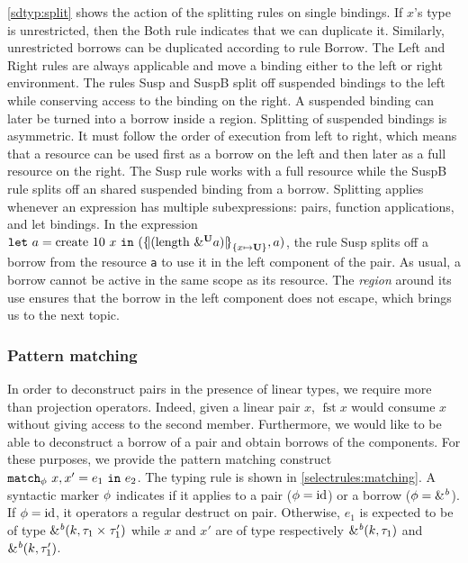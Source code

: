 \cref{sdtyp:split} shows the action of the splitting rules on single
bindings. If $x$'s type is unrestricted, then
the {\sc Both} rule indicates that we can duplicate it.
Similarly, unrestricted borrows can be duplicated according to rule
{\sc Borrow}.
The {\sc Left} and {\sc Right} rules are always applicable and move a binding
either to the left or right environment.
The rules {\sc Susp} and {\sc SuspB} split off suspended bindings to
the left while conserving access to the binding on the right.
A suspended binding can later be turned
into a borrow inside a region. Splitting of suspended bindings is
asymmetric. It must follow the order of execution from left to right,
which means that a resource can be used first as a borrow on the left
and then later as a full resource on the right. The {\sc Susp} rule
works with a full resource while the {\sc SuspB}
rule splits off an shared suspended binding from a borrow.
%
Splitting applies whenever an
expression has multiple subexpressions:  pairs, function applications,
and let bindings. In the
expression
$\letin{a}{\text{create}\ 10\ x}
{\introPair{\region[{}]{\Sone x\IBORROW}{\app{\text{length}}{\borrow[\IBORROW]{a}}}}{a}}$,
the rule {\sc Susp} splits off a borrow from  the resource
\lstinline/a/ to use it in the left component of the pair.
As usual, a borrow cannot be active in the same scope as its resource.
The \emph{region} around its use ensures that the borrow in the left component does not
escape, which brings us to the next topic.


\subsubsection{Pattern matching}
\label{sdtyping:matching}

In order to deconstruct pairs in the presence of linear types, we require
more than projection operators. Indeed, given a linear pair $x$,
$\operatorname{fst} x$ would consume $x$ without giving access to the second
member.
Furthermore, we would like to be able to deconstruct a borrow of a pair
and obtain borrows of the components.
For these purposes, we provide the pattern matching construct
$\matchin{x,x'}{e_1}{e_2}$. The typing rule is shown in \cref{selectrules:matching}.
A syntactic marker $\etransfm$ indicates if it applies to
a pair ($\etransfm = \operatorname{id}$) or a borrow ($\etransfm = \&^\BORROW$).
If $\etransfm = \operatorname{id}$, it operators a regular destruct on pair.
Otherwise, $e_1$ is expected to be of type
$\borrowty{k}{\tyPair{\tau_1}{\tau'_1}}$
while $x$ and $x'$ are of type respectively
$\borrowty{k}{\tau_1}$ and $\borrowty{k}{\tau'_1}$.


